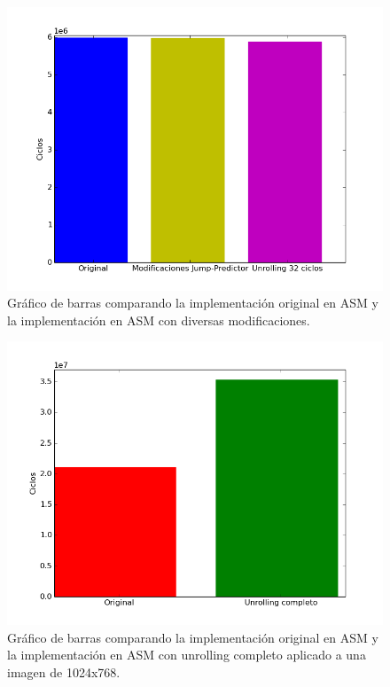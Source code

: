 \begin{figure}[h!]
\centering
\captionsetup{justification=centering}
	\includegraphics[width = 16 cm, height = 10 cm]{imagenes/jmpunro.png}
	\caption[center]{Gráfico de barras comparando la implementación original en ASM y la implementación en ASM con diversas modificaciones.}
\end{figure}
	
\medskip

\begin{figure}[h!]
\centering
	\captionsetup{justification=centering}
	\includegraphics[width = 12 cm, height = 8 cm]{imagenes/1024.png}
	\caption[center]{Gráfico de barras comparando la implementación original en ASM y la implementación en ASM con unrolling completo aplicado a una imagen de 1024x768.}
\end{figure}
	
